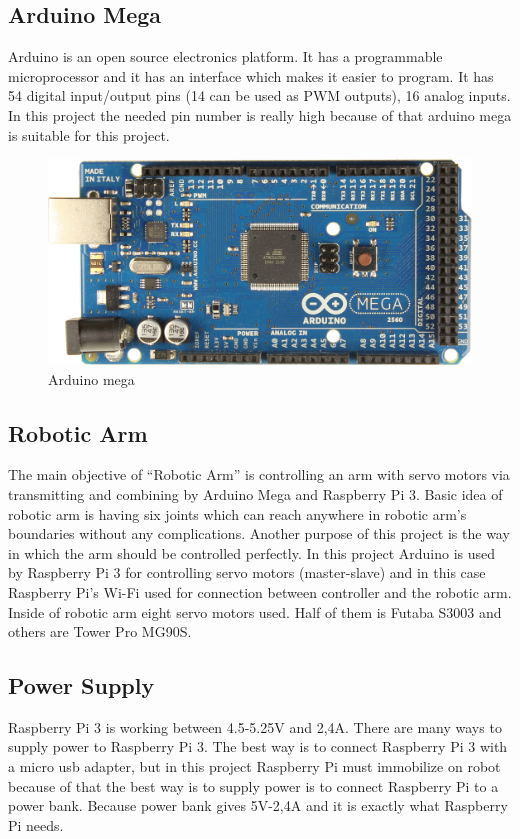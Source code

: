 \documentclass[12pt,a4paper]{article}
\begin{document}
\pagebreak
\subsection{Arduino Mega}
Arduino is an open source electronics platform. It has a programmable microprocessor and it has an interface which makes it easier to program. 
It has 54 digital input/output pins (14 can be used as PWM outputs), 16 analog inputs. In this project the needed pin number is really 
high because of that arduino mega is suitable for this project. 
\begin{figure}[h!]
  \begin{center}
    \includegraphics[scale=0.1]{arduino_mega}
    \caption{Arduino mega}
  \end{center}
\end{figure}

\subsection{Robotic Arm}
The main objective of “Robotic Arm” is controlling an arm with servo motors via transmitting and combining by Arduino Mega and Raspberry Pi 3. 
Basic idea of robotic arm is having six joints which can reach anywhere in robotic arm’s boundaries without any complications. Another purpose 
of this project is the way in which the arm should be controlled perfectly. In this project Arduino is used by Raspberry Pi 3 for controlling 
servo motors (master-slave) and in this case Raspberry Pi’s Wi-Fi used for connection between controller and the robotic arm. Inside of robotic arm eight servo 
motors used. Half of them is Futaba S3003 and others are Tower Pro MG90S.

\subsection{Power Supply}
Raspberry Pi 3 is working between 4.5-5.25V and 2,4A. There are many ways to supply power to Raspberry Pi 3. The best way is to connect Raspberry Pi 3 
with a micro usb adapter, but in this project Raspberry Pi must immobilize on robot because of that the best way is to supply power is to connect 
Raspberry Pi to a power bank. Because power bank gives 5V-2,4A and it is exactly what Raspberry Pi needs.
\end{document}
